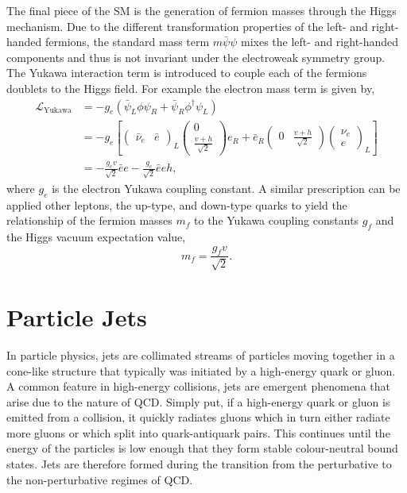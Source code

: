 The final piece of the SM is the generation of fermion masses through the Higgs mechanism.
Due to the different transformation properties of the left- and right-handed fermions, the standard mass term $m \bar \psi \psi$ mixes the left- and right-handed components and thus is not invariant under the electroweak symmetry group.
The Yukawa interaction term is introduced to couple each of the fermions doublets to the Higgs field.
For example the electron mass term is given by,
\begin{equation}
	\label{eq:yukawa}
	\begin{split}
		\mathcal{L}_\text{Yukawa} & = -g_e( \bar \psi_L \phi \psi_R + \bar \psi_R \phi^\dagger \psi_L)    \\
		                          & = -g_e \left[
			\begin{pmatrix} \bar \nu_e & \bar e \end{pmatrix}_L \begin{pmatrix} 0 \\ \frac{v + h}{\sqrt{2}} \end{pmatrix} e_R
			+ \bar e_R \begin{pmatrix} 0 & \frac{v + h}{\sqrt{2}} \end{pmatrix} \begin{pmatrix} \nu_e \\ e \end{pmatrix}_L
		\right]                                                                                           \\
		                          & = -\frac{g_e v}{\sqrt{2}} \bar e e - \frac{g_e}{\sqrt{2}} \bar e e h,
	\end{split}
\end{equation}
where $g_e$ is the electron Yukawa coupling constant.
A similar prescription can be applied other leptons, the up-type, and down-type quarks to yield the relationship of the fermion masses $m_f$ to the Yukawa coupling constants $g_f$ and the Higgs vacuum expectation value,
\begin{equation}
	\label{eq:fermion_mass}
	m_f = \frac{g_f v}{\sqrt{2}}.
\end{equation}

\section{Particle Jets}
\label{sec:jets}

In particle physics, jets are collimated streams of particles moving together in a cone-like structure that typically was initiated by a high-energy quark or gluon.
A common feature in high-energy collisions, jets are emergent phenomena that arise due to the nature of QCD.
Simply put, if a high-energy quark or gluon is emitted from a collision, it quickly radiates gluons which in turn either radiate more gluons or which split into quark-antiquark pairs.
This continues until the energy of the particles is low enough that they form stable colour-neutral bound states.
Jets are therefore formed during the transition from the perturbative to the non-perturbative regimes of QCD.

